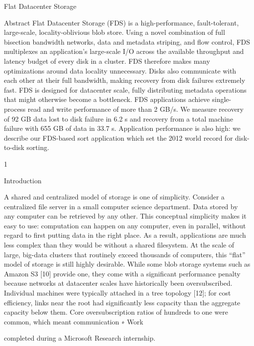 Flat Datacenter Storage

Abstract
Flat Datacenter Storage (FDS) is a high-performance, fault-tolerant,
large-scale, locality-oblivious blob store.
Using a novel combination of full bisection bandwidth networks, data and
metadata striping, and flow control, FDS multiplexes an application’s
large-scale I/O across the available throughput and latency budget of every disk
in a cluster. 
FDS therefore makes many optimizations around data locality unnecessary.
Disks also communicate with each other at their full bandwidth, making recovery
from disk failures extremely fast. 
FDS is designed for datacenter scale, fully distributing metadata operations
that might otherwise become a bottleneck.
FDS applications achieve single-process read and write performance of more than
2 GB/s. 
We measure recovery of 92 GB data lost to disk failure in 6.2 s and recovery
from a total machine failure with 655 GB of data in 33.7 s.
Application performance is also high: we describe our FDS-based sort application
which set the 2012 world record for disk-to-disk sorting.

1

Introduction

A shared and centralized model of storage is one of
simplicity. Consider a centralized file server in a small
computer science department. Data stored by any computer can be retrieved by any other. This conceptual
simplicity makes it easy to use: computation can happen on any computer, even in parallel, without regard to
first putting data in the right place. As a result, applications are much less complex than they would be without
a shared filesystem.
At the scale of large, big-data clusters that routinely
exceed thousands of computers, this “flat” model of storage is still highly desirable. While some blob storage systems such as Amazon S3 [10] provide one, they
come with a significant performance penalty because
networks at datacenter scales have historically been oversubscribed. Individual machines were typically attached
in a tree topology [12]; for cost efficiency, links near the
root had significantly less capacity than the aggregate capacity below them. Core oversubscription ratios of hundreds to one were common, which meant communication
∗ Work

completed during a Microsoft Research internship.

